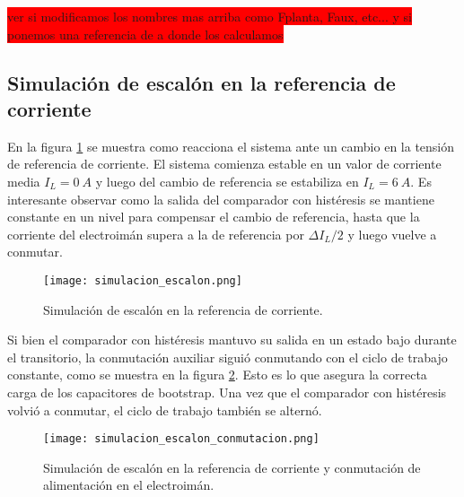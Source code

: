 \colorbox{red}{ver si modificamos los nombres mas arriba como Fplanta, Faux, etc... y si ponemos una referencia de a donde los calculamos}

%

\subsection{Simulación de escalón en la referencia de corriente}

En la figura \ref{fig:simulacion_escalon} se muestra como reacciona el sistema ante un cambio en la tensión de referencia de corriente. El sistema comienza estable en un valor de corriente media $I_L=0\:A$ y luego del cambio de referencia se estabiliza en $I_L=6\:A$. Es interesante observar como la salida del comparador con histéresis se mantiene constante en un nivel para compensar el cambio de referencia, hasta que la corriente del electroimán supera a la de referencia por $\Delta I_L /2$ y luego vuelve a conmutar. 

\begin{figure}[H]
	\centering
	\texttt{[image: simulacion\_escalon.png]}
	\caption{Simulación de escalón en la referencia de corriente.}
	\label{fig:simulacion_escalon}
\end{figure}

Si bien el comparador con histéresis mantuvo su salida en un estado bajo durante el transitorio, la conmutación auxiliar siguió conmutando con el ciclo de trabajo constante, como se muestra en la figura \ref{fig:simulacion_escalon_conmutacion}. Esto es lo que asegura la correcta carga de los capacitores de bootstrap. Una vez que el comparador con histéresis volvió a conmutar, el ciclo de trabajo también se alternó.

\begin{figure}[H]
	\centering
	\texttt{[image: simulacion\_escalon\_conmutacion.png]}
	\caption{Simulación de escalón en la referencia de corriente y conmutación de alimentación en el electroimán.}
	\label{fig:simulacion_escalon_conmutacion}
\end{figure}

